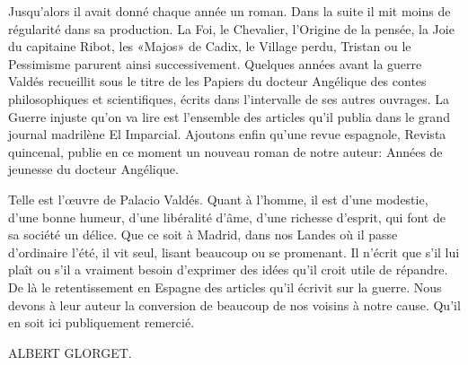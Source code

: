 Jusqu'alors il avait donné chaque année un roman. Dans la suite il mit
moins de régularité dans sa production. La Foi, le Chevalier, l'Origine
de la pensée, la Joie du capitaine Ribot, les «Majos» de Cadix, le
Village perdu, Tristan ou le Pessimisme parurent ainsi successivement.
Quelques années avant la guerre Valdés recueillit sous le titre de les
Papiers du docteur Angélique des contes philosophiques et
scientifiques, écrits dans l'intervalle de ses autres ouvrages. La
Guerre injuste qu'on va lire est l'ensemble des articles qu'il publia
dans le grand journal madrilène El Imparcial. Ajoutons enfin qu'une
revue espagnole, Revista quincenal, publie en ce moment un nouveau
roman de notre auteur: Années de jeunesse du docteur Angélique.

Telle est l'œuvre de Palacio Valdés. Quant à l'homme, il est d'une
modestie, d'une bonne humeur, d'une libéralité d'âme, d'une richesse
d'esprit, qui font de sa société un délice. Que ce soit à Madrid, dans
nos Landes où il passe d'ordinaire l'été, il vit seul, lisant beaucoup
ou se promenant. Il n'écrit que s'il lui plaît ou s'il a vraiment besoin
d'exprimer des idées qu'il croit utile de répandre. De là le
retentissement en Espagne des articles qu'il écrivit sur la guerre. Nous
devons à leur auteur la conversion de beaucoup de nos voisins à notre
cause. Qu'il en soit ici publiquement remercié.

\begin{flushright}
ALBERT GLORGET.
\end{flushright}
